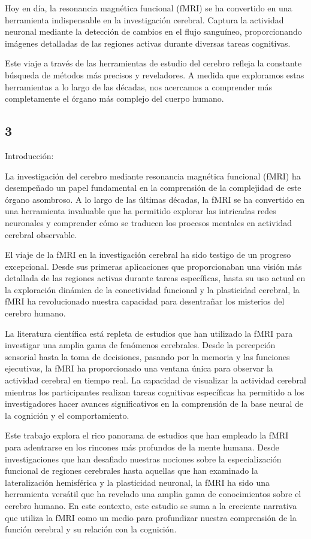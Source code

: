 \documentclass[12pt,oneside]{uhthesis}
\begin{document}
Hoy en día, la resonancia magnética funcional (fMRI) se ha convertido en una herramienta indispensable en la investigación cerebral. Captura la actividad neuronal mediante la detección de cambios en el flujo sanguíneo, proporcionando imágenes detalladas de las regiones activas durante diversas tareas cognitivas.

Este viaje a través de las herramientas de estudio del cerebro refleja la constante búsqueda de métodos más precisos y reveladores. A medida que exploramos estas herramientas a lo largo de las décadas, nos acercamos a comprender más completamente el órgano más complejo del cuerpo humano.

\subsection{3}
Introducción:

La investigación del cerebro mediante resonancia magnética funcional (fMRI) ha desempeñado un papel fundamental en la comprensión de la complejidad de este órgano asombroso. A lo largo de las últimas décadas, la fMRI se ha convertido en una herramienta invaluable que ha permitido explorar las intricadas redes neuronales y comprender cómo se traducen los procesos mentales en actividad cerebral observable.

El viaje de la fMRI en la investigación cerebral ha sido testigo de un progreso excepcional. Desde sus primeras aplicaciones que proporcionaban una visión más detallada de las regiones activas durante tareas específicas, hasta su uso actual en la exploración dinámica de la conectividad funcional y la plasticidad cerebral, la fMRI ha revolucionado nuestra capacidad para desentrañar los misterios del cerebro humano.

La literatura científica está repleta de estudios que han utilizado la fMRI para investigar una amplia gama de fenómenos cerebrales. Desde la percepción sensorial hasta la toma de decisiones, pasando por la memoria y las funciones ejecutivas, la fMRI ha proporcionado una ventana única para observar la actividad cerebral en tiempo real. La capacidad de visualizar la actividad cerebral mientras los participantes realizan tareas cognitivas específicas ha permitido a los investigadores hacer avances significativos en la comprensión de la base neural de la cognición y el comportamiento.

Este trabajo explora el rico panorama de estudios que han empleado la fMRI para adentrarse en los rincones más profundos de la mente humana. Desde investigaciones que han desafiado nuestras nociones sobre la especialización funcional de regiones cerebrales hasta aquellas que han examinado la lateralización hemisférica y la plasticidad neuronal, la fMRI ha sido una herramienta versátil que ha revelado una amplia gama de conocimientos sobre el cerebro humano. En este contexto, este estudio se suma a la creciente narrativa que utiliza la fMRI como un medio para profundizar nuestra comprensión de la función cerebral y su relación con la cognición.
\end{document}
